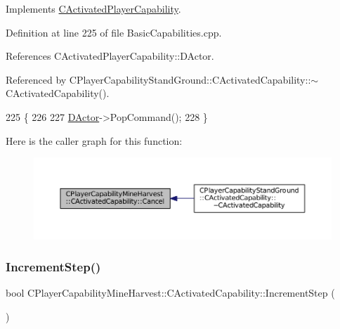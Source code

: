 Implements \hyperlink{classCActivatedPlayerCapability_a5cde83be468e262ad054d81e28684a81}{C\+Activated\+Player\+Capability}.



Definition at line 225 of file Basic\+Capabilities.\+cpp.



References C\+Activated\+Player\+Capability\+::\+D\+Actor.



Referenced by C\+Player\+Capability\+Stand\+Ground\+::\+C\+Activated\+Capability\+::$\sim$\+C\+Activated\+Capability().


\begin{DoxyCode}
225                                                              \{
226 
227     \hyperlink{classCActivatedPlayerCapability_a54ca944b47bff2718330639941d402b0}{DActor}->PopCommand();
228 \}
\end{DoxyCode}
Here is the caller graph for this function\+:\nopagebreak
\begin{figure}[H]
\begin{center}
\leavevmode
\includegraphics[width=350pt]{classCPlayerCapabilityMineHarvest_1_1CActivatedCapability_ab1fef064fbc085a6419b5a822e787614_icgraph}
\end{center}
\end{figure}
\hypertarget{classCPlayerCapabilityMineHarvest_1_1CActivatedCapability_a46dbd6e2ae2fb889da1714c97ed3ca2f}{}\label{classCPlayerCapabilityMineHarvest_1_1CActivatedCapability_a46dbd6e2ae2fb889da1714c97ed3ca2f} 
\subsubsection{\texorpdfstring{Increment\+Step()}{IncrementStep()}}
{\footnotesize\ttfamily bool C\+Player\+Capability\+Mine\+Harvest\+::\+C\+Activated\+Capability\+::\+Increment\+Step (\begin{DoxyParamCaption}{ }\end{DoxyParamCaption})\hspace{0.3cm}{\ttfamily [virtual]}}



